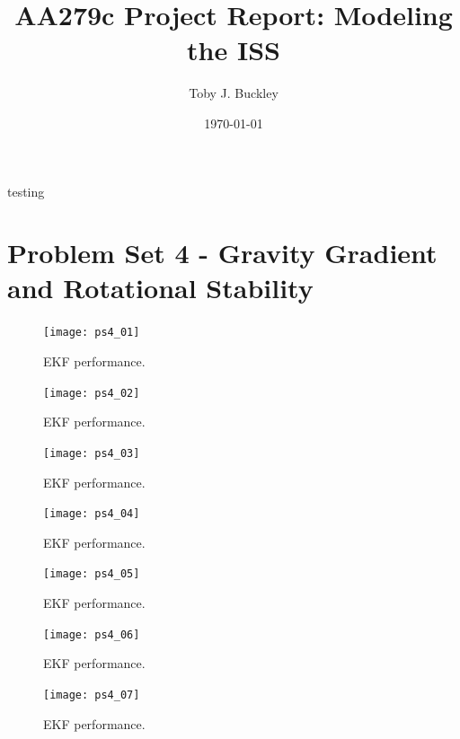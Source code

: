 \documentclass[12pt, letterpaper]{article}
\title{AA279c Project Report: Modeling the ISS}
\author{Toby J. Buckley}
\date{\today}
\begin{document}
\begin{titlepage}
	\maketitle
\end{titlepage}


testing






\section{Problem Set 4 - Gravity Gradient and Rotational Stability}


\begin{figure}[H]
	\centering
	\texttt{[image: ps4\_01]}
	\caption{EKF performance.}
	\label{4:ekf}
\end{figure}


\begin{figure}[H]
	\centering
	\texttt{[image: ps4\_02]}
	\caption{EKF performance.}
	\label{4:ekf}
\end{figure}


\begin{figure}[H]
	\centering
	\texttt{[image: ps4\_03]}
	\caption{EKF performance.}
	\label{4:ekf}
\end{figure}


\begin{figure}[H]
	\centering
	\texttt{[image: ps4\_04]}
	\caption{EKF performance.}
	\label{4:ekf}
\end{figure}


\begin{figure}[H]
	\centering
	\texttt{[image: ps4\_05]}
	\caption{EKF performance.}
	\label{4:ekf}
\end{figure}


\begin{figure}[H]
	\centering
	\texttt{[image: ps4\_06]}
	\caption{EKF performance.}
	\label{4:ekf}
\end{figure}


\begin{figure}[H]
	\centering
	\texttt{[image: ps4\_07]}
	\caption{EKF performance.}
	\label{4:ekf}
\end{figure}
\end{document}
